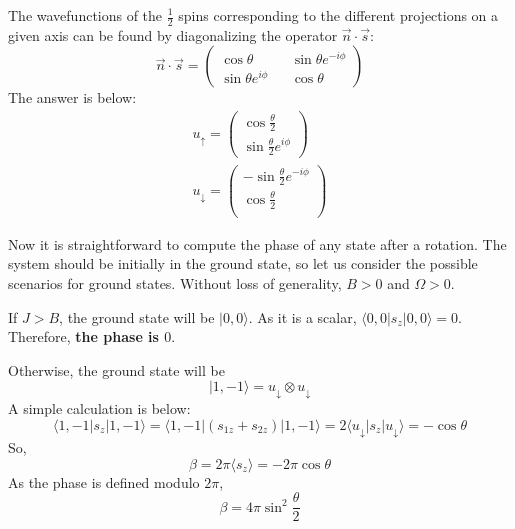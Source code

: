 \documentclass{article}
\begin{document}
The wavefunctions of the $\frac{1}{2}$ spins corresponding to the different projections
on a given axis can be found by diagonalizing the operator $\vec{n} \cdot \vec{s}$:
\begin{equation}
    \vec{n} \cdot \vec{s} = \begin{pmatrix}
                                \cos{\theta} && \sin{\theta} e^{-i\phi} \\
                                \sin{\theta} e^{i\phi} && \cos{\theta}
                            \end{pmatrix}
\end{equation}
The answer is below:
\begin{equation}
    \begin{gathered}
        u_\uparrow = \begin{pmatrix}
                        \cos{\frac{\theta}{2}} \\
                        \sin{\frac{\theta}{2}e^{i\phi}}
                    \end{pmatrix}\\
        u_\downarrow = \begin{pmatrix}
                        -\sin{\frac{\theta}{2}e^{-i\phi}}\\
                        \cos{\frac{\theta}{2}} \\
                    \end{pmatrix}
    \end{gathered}
\end{equation}

Now it is straightforward to compute the phase of any state after a rotation. The system 
should be initially in the ground state, so let us consider the possible scenarios for
ground states. Without loss of generality, $B > 0$ and $\Omega > 0$.

If $J > B$, the ground state will be $|0,0\rangle$. As it is a scalar, 
$\langle 0,0|s_z|0,0\rangle = 0$. Therefore, {\bf the phase is $0$}.

Otherwise, the ground state will be 
\begin{equation}
    |1, -1\rangle = 
        u_\downarrow\otimes u_\downarrow
\end{equation}
A simple calculation is below:
\begin{equation}
    \langle 1, -1 | s_z | 1, -1\rangle = 
    \langle 1, -1 | (s_{1z} + s_{2z}) | 1, -1\rangle = 
    2\langle u_\downarrow | s_z | u_\downarrow \rangle = -\cos{\theta}
\end{equation}
So,
\begin{equation}
    \beta = 2\pi \langle s_z \rangle = -2\pi \cos{\theta}
\end{equation}
As the phase is defined modulo $2\pi$,
\begin{equation}
    \beta = 4\pi \sin^2{\frac{\theta}{2}}
\end{equation}
\end{document}
